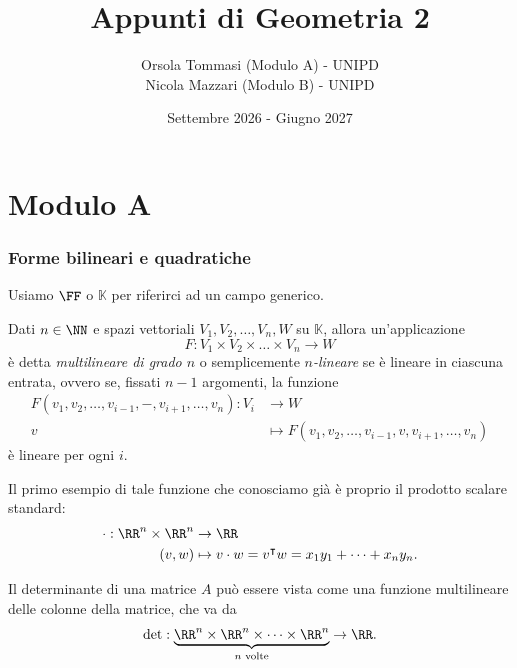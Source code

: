 \documentclass[11pt]{scrartcl}
\newcommand{\KK}{\mathbb{K}}
\begin{document}
	\title{Appunti di Geometria 2}
	\subtitle{
		Orsola Tommasi (Modulo A) - UNIPD \\
		Nicola Mazzari (Modulo B) - UNIPD
	}
	\date{Settembre 2026 - Giugno 2027}
	
	
	\maketitle
	
	\tableofcontents
	
	\newpage
	
	\part{Modulo A}
	
	\section{Forme bilineari e quadratiche}
	
	Usiamo $\FF$ o $\KK$ per riferirci ad un campo generico.
	\begin{definition}
		Dati $n\in\NN$ e spazi vettoriali $V_1,V_2,\dots,V_n,W$ su $\KK$, allora un'applicazione
		$$F:V_1\times V_2\times \dots \times V_n\to W$$
		è detta \textit{multilineare di grado $n$} o semplicemente \textit{$n$-lineare} se è lineare in ciascuna entrata, ovvero se, fissati $n-1$ argomenti, la funzione
		\begin{align*}
			F\left(v_1,v_2,\dots,v_{i-1},-,v_{i+1},\dots,v_n\right):V_i&\to  W \\
			v & \mapsto  F\left(v_1,v_2,\dots,v_{i-1},v,v_{i+1},\dots,v_n\right)
		\end{align*}
		è lineare per ogni $i$.
	\end{definition}
	\begin{example}
		Il primo esempio di tale funzione che conosciamo già è proprio il prodotto scalare standard:
		\begin{align*}
			\cdot:\RR^n\times \RR^n & \to \RR \\
			(v,w)&\mapsto v\cdot w = v^\intercal w = x_1y_1+\dots+x_ny_n.
		\end{align*}
	\end{example}
	
	\begin{example}[Determinante]
		Il determinante di una matrice $A$ può essere vista come una funzione multilineare delle colonne della matrice, che va da
		$$\det:\underset{\text{$n$ volte}}{\underbrace{\RR^n\times \RR^n \times \dots \times \RR^n}}\to\RR.$$
	\end{example}
	
\end{document}
